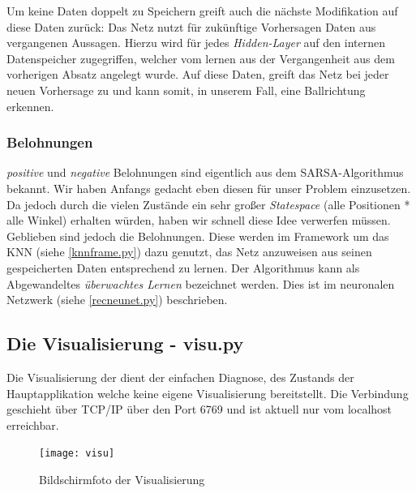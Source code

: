 \documentclass[12pt,twoside]{article}
\theoremstyle{plain}
\theoremstyle{definition}
\theoremstyle{remark}
\begin{document}
Um keine Daten doppelt zu Speichern greift auch die nächste Modifikation auf diese Daten zurück: Das Netz nutzt für zukünftige Vorhersagen Daten aus vergangenen Aussagen. Hierzu wird für jedes \textit{Hidden-Layer} auf den internen Datenspeicher zugegriffen, welcher vom lernen aus der Vergangenheit aus dem vorherigen Absatz angelegt wurde. Auf diese Daten, greift das Netz bei jeder neuen Vorhersage zu und kann somit, in unserem Fall, eine Ballrichtung erkennen. 


\subsubsection{Belohnungen}
\label{rewards}

\textit{positive} und \textit{negative} Belohnungen sind eigentlich aus dem SARSA-Algorithmus bekannt. Wir haben Anfangs gedacht eben diesen für unser Problem einzusetzen. Da jedoch durch die vielen Zustände ein sehr großer \textit{Statespace} (alle Positionen * alle Winkel) erhalten würden, haben wir schnell diese Idee verwerfen müssen. Geblieben sind jedoch die Belohnungen. Diese werden im Framework um das KNN (siehe \ref{knnframe.py}) dazu genutzt, das Netz anzuweisen aus seinen gespeicherten Daten entsprechend zu lernen. Der Algorithmus kann als Abgewandeltes \textit{überwachtes Lernen} bezeichnet werden. Dies ist im neuronalen Netzwerk (siehe \ref{recneunet.py}) beschrieben.


\subsection{Die Visualisierung - visu.py}
\label{visu.py}

Die Visualisierung der dient der einfachen Diagnose, des Zustands der Hauptapplikation welche keine eigene Visualisierung bereitstellt. Die Verbindung geschieht über TCP/IP über den Port 6769 und ist aktuell nur vom localhost erreichbar.

\begin{figure}[hbtp]
	 \centerline{\texttt{[image: visu]}}
	 {\caption{Bildschirmfoto der Visualisierung}\label{fig:visu}}
\end{figure}
\end{document}
